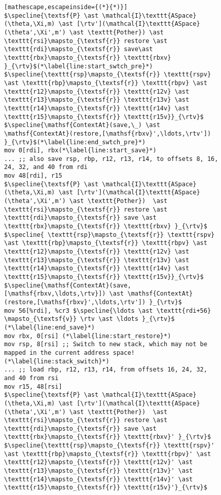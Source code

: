 \begin{figure}\footnotesize
\begin{lstlisting}[mathescape,escapeinside={(*}{*)}]
$\specline{\textsf{P} \ast \mathcal{I}\texttt{ASpace}(\theta,\Xi,m) \ast [\rtv'](\mathcal{I}\texttt{ASpace}(\theta',\Xi',m') \ast \texttt{Pother}) \ast \texttt{rsi}\mapsto_{\textsf{r}} restore \ast \texttt{rdi}\mapsto_{\textsf{r}} save\ast \texttt{rbx}\mapsto_{\textsf{r}} \texttt{rbxv} }_{\rtv}$(*\label{line:start_swtch_pre}*)
$\specline{\texttt{rsp}\mapsto_{\textsf{r}} \texttt{rspv} \ast \texttt{rbp}\mapsto_{\textsf{r}} \texttt{rbpv} \ast \texttt{r12}\mapsto_{\textsf{r}} \texttt{r12v} \ast \texttt{r13}\mapsto_{\textsf{r}} \texttt{r13v} \ast \texttt{r14}\mapsto_{\textsf{r}} \texttt{r14v} \ast \texttt{r15}\mapsto_{\textsf{r}} \texttt{r15v}}_{\rtv}$
$\specline{\mathsf{ContextAt}(save,\_) \ast \mathsf{ContextAt}(restore,[\mathsf{rbxv}',\ldots,\rtv']) }_{\rtv}$(*\label{line:end_swtch_pre}*)
mov 0[rdi], rbx(*\label{line:start_save}*)
... ;; also save rsp, rbp, r12, r13, r14, to offsets 8, 16, 24, 32, and 40 from rdi
mov 48[rdi], r15
$\specline{\textsf{P} \ast \mathcal{I}\texttt{ASpace}(\theta,\Xi,m) \ast [\rtv'](\mathcal{I}\texttt{ASpace}(\theta',\Xi',m') \ast \texttt{Pother})  \ast  \texttt{rsi}\mapsto_{\textsf{r}} restore \ast \texttt{rdi}\mapsto_{\textsf{r}} save \ast \texttt{rbx}\mapsto_{\textsf{r}} \texttt{rbxv} }_{\rtv}$
$\specline{ \texttt{rsp}\mapsto_{\textsf{r}} \texttt{rspv} \ast \texttt{rbp}\mapsto_{\textsf{r}} \texttt{rbpv} \ast \texttt{r12}\mapsto_{\textsf{r}} \texttt{r12v} \ast \texttt{r13}\mapsto_{\textsf{r}} \texttt{r13v} \ast \texttt{r14}\mapsto_{\textsf{r}} \texttt{r14v} \ast \texttt{r15}\mapsto_{\textsf{r}} \texttt{r15v}}_{\rtv}$
$\specline{\mathsf{ContextAt}(save,[\mathsf{rbxv,\ldots,\rtv}]) \ast \mathsf{ContextAt}(restore,[\mathsf{rbxv}',\ldots,\rtv']) }_{\rtv}$
mov 56[%rdi], %cr3 $\specline{\ldots \ast \texttt{rdi+56} \mapsto_{\textsf{v}} \rtv \ast \ldots }_{\rtv}$   (*\label{line:end_save}*) 
mov rbx, 0[rsi] (*\label{line:start_restore}*)
mov rsp, 8[rsi] ;; Switch to new stack, which may not be mapped in the current address space!(*\label{line:stack_switch}*)
... ;; load rbp, r12, r13, r14, from offsets 16, 24, 32, and 40 from rsi
mov r15, 48[rsi]
$\specline{\textsf{P} \ast \mathcal{I}\texttt{ASpace}(\theta,\Xi,m) \ast [\rtv'](\mathcal{I}\texttt{ASpace}(\theta',\Xi',m') \ast \texttt{Pother})  \ast  \texttt{rsi}\mapsto_{\textsf{r}} restore \ast \texttt{rdi}\mapsto_{\textsf{r}} save \ast \texttt{rbx}\mapsto_{\textsf{r}} \texttt{rbxv}' }_{\rtv}$
$\specline{\texttt{rsp}\mapsto_{\textsf{r}} \texttt{rspv}' \ast \texttt{rbp}\mapsto_{\textsf{r}} \texttt{rbpv}' \ast \texttt{r12}\mapsto_{\textsf{r}} \texttt{r12v}' \ast \texttt{r13}\mapsto_{\textsf{r}} \texttt{r13v}' \ast \texttt{r14}\mapsto_{\textsf{r}} \texttt{r14v}' \ast \texttt{r15}\mapsto_{\textsf{r}} \texttt{r15v}'}_{\rtv}$

\end{lstlisting}
\end{figure}
